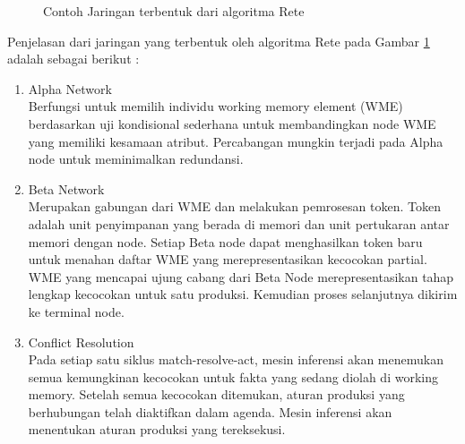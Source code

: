 \begin{figure}[h]	
	{\par}
	\caption{Contoh Jaringan terbentuk  dari algoritma Rete}
	\label{fig:rete}
\end{figure}

Penjelasan dari jaringan yang terbentuk oleh algoritma Rete pada Gambar \ref{fig:rete} adalah sebagai berikut :
\begin{enumerate}
	\item Alpha Network\\
	Berfungsi untuk memilih individu working memory element (WME) berdasarkan uji kondisional sederhana untuk membandingkan node WME yang memiliki kesamaan atribut. Percabangan mungkin terjadi pada Alpha node untuk meminimalkan redundansi.
	\item Beta Network\\
	Merupakan gabungan dari WME dan melakukan pemrosesan token. Token adalah unit penyimpanan yang berada di memori dan unit pertukaran antar memori dengan node. Setiap Beta node dapat menghasilkan token baru untuk menahan daftar WME yang merepresentasikan kecocokan partial. WME yang mencapai ujung cabang dari Beta Node merepresentasikan tahap lengkap kecocokan untuk satu produksi. Kemudian proses selanjutnya dikirim ke terminal node.
	\item Conflict Resolution\\
	Pada setiap satu siklus match-resolve-act, mesin inferensi akan menemukan semua kemungkinan kecocokan untuk fakta yang sedang diolah di working memory. Setelah semua kecocokan ditemukan, aturan produksi yang berhubungan telah diaktifkan dalam agenda. Mesin inferensi akan menentukan aturan produksi yang tereksekusi.  
\end{enumerate}

